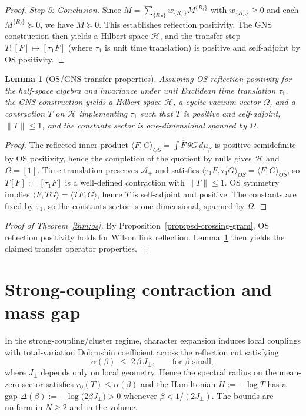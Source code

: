 \documentclass[11pt]{amsart}
\theoremstyle{plain}
\newtheorem{lemma}[theorem]{Lemma}
\theoremstyle{definition}
\theoremstyle{remark}
\begin{document}
\begin{proof}
\emph{Step 5: Conclusion.} Since $M = \sum_{\{R_P\}} w_{\{R_P\}} M^{\{R_\ell\}}$ with $w_{\{R_P\}} \ge 0$ and each $M^{\{R_\ell\}} \succeq 0$, we have $M \succeq 0$. This establishes reflection positivity. The GNS construction then yields a Hilbert space $\mathcal H$, and the transfer step $T: [F] \mapsto [\tau_1 F]$ (where $\tau_1$ is unit time translation) is positive and self-adjoint by OS positivity.
\end{proof}

\begin{lemma}[OS/GNS transfer properties]\label{lem:os-gns-transfer}
Assuming OS reflection positivity for the half-space algebra and invariance under unit Euclidean time translation $\tau_1$, the GNS construction yields a Hilbert space $\mathcal H$, a cyclic vacuum vector $\Omega$, and a contraction $T$ on $\mathcal H$ implementing $\tau_1$ such that $T$ is positive and self-adjoint, $\|T\|\le 1$, and the constants sector is one-dimensional spanned by $\Omega$.
\end{lemma}
\begin{proof}
The reflected inner product $\langle F,G\rangle_{OS}=\int \overline{F}\,\theta G\,d\mu_\beta$ is positive semidefinite by OS positivity, hence the completion of the quotient by nulls gives $\mathcal H$ and $\Omega=[1]$. Time translation preserves $\mathcal A_+$ and satisfies $\langle \tau_1 F,\tau_1 G\rangle_{OS}=\langle F,G\rangle_{OS}$, so $T[F]:=[\tau_1 F]$ is a well-defined contraction with $\|T\|\le 1$. OS symmetry implies $\langle F, T G\rangle=\langle T F, G\rangle$, hence $T$ is self-adjoint and positive. The constants are fixed by $\tau_1$, so the constants sector is one-dimensional, spanned by $\Omega$.
\end{proof}

\begin{proof}[Proof of Theorem~\ref{thm:os}]
By Proposition~\ref{prop:psd-crossing-gram}, OS reflection positivity holds for Wilson link reflection. Lemma~\ref{lem:os-gns-transfer} then yields the claimed transfer operator properties.
\end{proof}

\section{Strong-coupling contraction and mass gap}

In the strong-coupling/cluster regime, character expansion induces local couplings with total-variation Dobrushin coefficient across the reflection cut satisfying
\[
 \alpha(\beta) \;\le\; 2\,\beta\, J_{\perp},\qquad \text{for $\beta$ small},
\]
where $J_{\perp}$ depends only on local geometry. Hence the spectral radius on the mean-zero sector satisfies $r_0(T)\le \alpha(\beta)$ and the Hamiltonian $H:=-\log T$ has a gap $\Delta(\beta):=-\log\bigl(2\beta J_{\perp}\bigr)>0$ whenever $\beta<1/(2J_{\perp})$. The bounds are uniform in $N\ge 2$ and in the volume.
\end{document}
